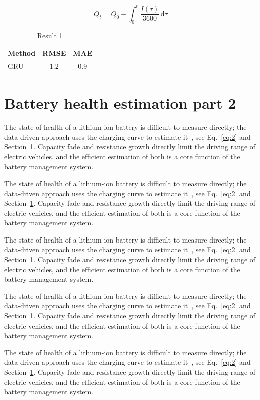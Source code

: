 \documentclass[11pt]{article}
\begin{document}
\begin{equation}\label{eq:1}
  Q_t = Q_0 - \int_0^t \frac{I(\tau)}{3600}\,\mathrm{d}\tau
\end{equation}
\begin{table}[h]\centering\begin{tabular}{lcc}\toprule Method & RMSE & MAE\\\midrule GRU & 1.2 & 0.9\\\bottomrule\end{tabular}\caption{Result 1}\end{table}

\section{Battery health estimation part 2}\label{sec:2}
The state of health of a lithium-ion battery is difficult to measure directly; the data-driven approach uses the charging curve to estimate it~\cite{a2020}, see Eq.~\eqref{eq:2} and Section~\ref{sec:2}. Capacity fade and resistance growth directly limit the driving range of electric vehicles, and the efficient estimation of both is a core function of the battery management system.

The state of health of a lithium-ion battery is difficult to measure directly; the data-driven approach uses the charging curve to estimate it~\cite{a2020}, see Eq.~\eqref{eq:2} and Section~\ref{sec:2}. Capacity fade and resistance growth directly limit the driving range of electric vehicles, and the efficient estimation of both is a core function of the battery management system.

The state of health of a lithium-ion battery is difficult to measure directly; the data-driven approach uses the charging curve to estimate it~\cite{a2020}, see Eq.~\eqref{eq:2} and Section~\ref{sec:2}. Capacity fade and resistance growth directly limit the driving range of electric vehicles, and the efficient estimation of both is a core function of the battery management system.

The state of health of a lithium-ion battery is difficult to measure directly; the data-driven approach uses the charging curve to estimate it~\cite{a2020}, see Eq.~\eqref{eq:2} and Section~\ref{sec:2}. Capacity fade and resistance growth directly limit the driving range of electric vehicles, and the efficient estimation of both is a core function of the battery management system.

The state of health of a lithium-ion battery is difficult to measure directly; the data-driven approach uses the charging curve to estimate it~\cite{a2020}, see Eq.~\eqref{eq:2} and Section~\ref{sec:2}. Capacity fade and resistance growth directly limit the driving range of electric vehicles, and the efficient estimation of both is a core function of the battery management system.
\end{document}
